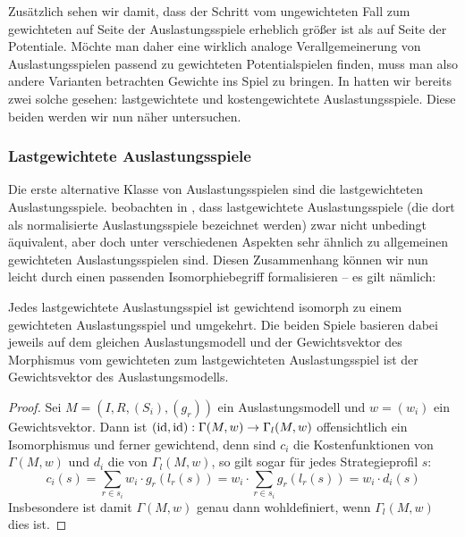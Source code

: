 Zusätzlich sehen wir damit, dass der Schritt vom ungewichteten Fall zum gewichteten auf Seite der Auslastungsspiele erheblich größer ist als auf Seite der Potentiale. Möchte man daher eine wirklich analoge Verallgemeinerung von Auslastungsspielen passend zu gewichteten Potentialspielen finden, muss man also andere Varianten betrachten Gewichte ins Spiel zu bringen. In  hatten wir bereits zwei solche gesehen: lastgewichtete und kostengewichtete Auslastungsspiele. Diese beiden werden wir nun näher untersuchen.

\subsubsection{Lastgewichtete Auslastungsspiele}

Die erste alternative Klasse von Auslastungsspielen sind die lastgewichteten Auslastungsspiele. \citeauthor{CharExGewPotinWCG} beobachten in \cite[S. 53]{CharExGewPotinWCG}, dass lastgewichtete Auslastungsspiele (die dort als normalisierte Auslastungsspiele bezeichnet werden) zwar nicht unbedingt äquivalent, aber doch unter verschiedenen Aspekten sehr ähnlich zu allgemeinen gewichteten Auslastungsspielen sind. Diesen Zusammenhang können wir nun leicht durch einen passenden Isomorphiebegriff formalisieren -- es gilt nämlich:

\begin{lemma}\label{lemma:lastgewAuslIsomGewAusl}
	Jedes lastgewichtete Auslastungsspiel ist gewichtend isomorph zu einem gewichteten Auslastungsspiel und umgekehrt. Die beiden Spiele basieren dabei jeweils auf dem gleichen Auslastungsmodell und der Gewichtsvektor des Morphismus vom gewichteten zum lastgewichteten Auslastungsspiel ist der Gewichtsvektor des Auslastungsmodells.
\end{lemma}

\begin{proof}
	Sei $M = (I, R, (S_i), (g_r))$ ein Auslastungsmodell und $w = (w_i)$ ein Gewichtsvektor. Dann ist $(\mathrm{id}, \mathrm{id}): \Gamma(M, w) \to \Gamma_l(M,w)$ offensichtlich ein Isomorphismus und ferner gewichtend, denn sind $c_i$ die Kostenfunktionen von $\Gamma(M, w)$ und $d_i$ die von $\Gamma_l(M,w)$, so gilt sogar für jedes Strategieprofil $s$:
		\[c_i(s) = \sum_{r \in s_i} w_i\cdot g_r(l_r(s)) = w_i \cdot \sum_{r \in s_i} g_r(l_r(s)) = w_i \cdot d_i(s)\]
	Insbesondere ist damit $\Gamma(M, w)$ genau dann wohldefiniert, wenn $\Gamma_l(M, w)$ dies ist.
\end{proof}

